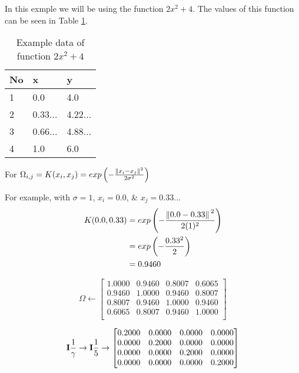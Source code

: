 In this exmple we will be using the function $2x^2+4$. The values of this function can be seen in Table \ref{table:1}.

\begin{table}[H]
  \centering
  \begin{tabular}{@{}lll@{}}
    \toprule
    No & x       & y       \\ \midrule
    1  & 0.0     & 4.0     \\
    2  & 0.33... & 4.22... \\
    3  & 0.66... & 4.88... \\
    4  & 1.0     & 6.0     \\
    \bottomrule
  \end{tabular}
  \caption{Example data of function $2x^2+4$} \label{table:1}
\end{table}
For $\Omega_{i,j}=K(x_i,x_j)=exp \left(-\frac{\norm*{x_i-x_j}^2}{2\sigma^2}\right)$

For example, with $\sigma=1$, $x_i=0.0$, \& $x_j = 0.33\dots$
\begin{equation}
  \begin{split}
    K(0.0,0.33) & = exp\left(-\frac{\norm*{0.0-0.33}^2}{2(1)^2}\right) \\
    & = exp\left(-\frac{0.33^2}{2}\right) \\
    & = 0.9460
  \end{split}
\end{equation}

\begin{equation}
  \Omega\gets
  \begin{bmatrix}
    1.0000 & 0.9460 & 0.8007 & 0.6065 \\
    0.9460 & 1.0000 & 0.9460 & 0.8007 \\
    0.8007 & 0.9460 & 1.0000 & 0.9460 \\
    0.6065 & 0.8007 & 0.9460 & 1.0000 \\
  \end{bmatrix}
\end{equation}

\begin{equation}
  \vb{I}\frac{1}{\gamma}\to\vb{I}\frac{1}{5}\to
  \begin{bmatrix}
    0.2000 & 0.0000 & 0.0000 & 0.0000 \\
    0.0000 & 0.2000 & 0.0000 & 0.0000 \\
    0.0000 & 0.0000 & 0.2000 & 0.0000 \\
    0.0000 & 0.0000 & 0.0000 & 0.2000
  \end{bmatrix}
\end{equation}

